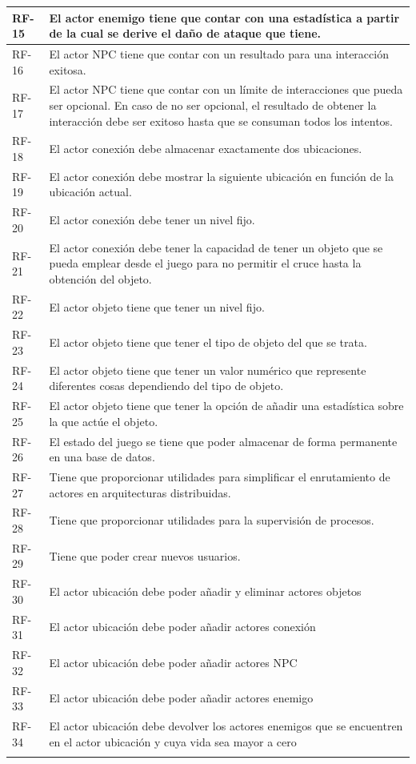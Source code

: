 {\begin{tabularx}{\textwidth}{|l|X|}
	RF-15 & El actor enemigo tiene que contar con una estadística a partir de la cual se derive el daño de ataque que tiene. \\ \hline
	RF-16 & El actor NPC tiene que contar con un resultado para una interacción exitosa. \\ \hline
	RF-17 & El actor NPC tiene que contar con un límite de interacciones que pueda ser opcional. En caso de no ser opcional, el resultado de obtener la interacción debe ser exitoso hasta que se consuman todos los intentos. \\ \hline
	RF-18 & El actor conexión debe almacenar exactamente dos ubicaciones. \\ \hline
	RF-19 & El actor conexión debe mostrar la siguiente ubicación en función de la ubicación actual. \\ \hline
	RF-20 & El actor conexión debe tener un nivel fijo. \\ \hline
	RF-21 & El actor conexión debe tener la capacidad de tener un objeto que se pueda emplear desde el juego para no permitir el cruce hasta la obtención del objeto. \\ \hline
	RF-22 & El actor objeto tiene que tener un nivel fijo. \\ \hline
	RF-23 & El actor objeto tiene que tener el tipo de objeto del que se trata. \\ \hline
	RF-24 & El actor objeto tiene que tener un valor numérico que represente diferentes cosas dependiendo del tipo de objeto. \\ \hline
	RF-25 & El actor objeto tiene que tener la opción de añadir una estadística sobre la que actúe el objeto. \\ \hline
	RF-26 & El estado del juego se tiene que poder almacenar de forma permanente en una base de datos. \\ \hline
	RF-27 & Tiene que proporcionar utilidades para simplificar el enrutamiento de actores en arquitecturas distribuidas. \\ \hline
	RF-28 & Tiene que proporcionar utilidades para la supervisión de procesos. \\ \hline
	RF-29 & Tiene que poder crear nuevos usuarios. \\ \hline
	RF-30 & El actor ubicación debe poder añadir y eliminar actores objetos \\ \hline
	RF-31 & El actor ubicación debe poder añadir actores conexión \\ \hline
	RF-32 & El actor ubicación debe poder añadir actores NPC \\ \hline
	RF-33 & El actor ubicación debe poder añadir actores enemigo \\ \hline
	RF-34 & El actor ubicación debe devolver los actores enemigos que se encuentren en el actor ubicación y cuya vida sea mayor a cero \\ \hline
	
	\caption{Hephaestus. Requisitos funcionales}
	\label{tab:hephaestus-req-func}
\end{tabularx}
}

